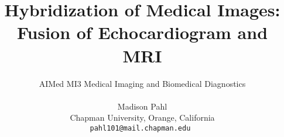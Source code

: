 \documentclass[a4paper]{article} %
\date{} %
\begin{document}
\title{Hybridization of Medical Images: \\ Fusion of Echocardiogram and MRI}

\author{AIMed MI3 Medical Imaging and Biomedical Diagnostics\\ \\%
       Madison Pahl \\ %
       Chapman University, Orange, California \\ %
       \tt{pahl101@mail.chapman.edu} %
       }%


\maketitle

\thispagestyle{empty}



\end{document}
